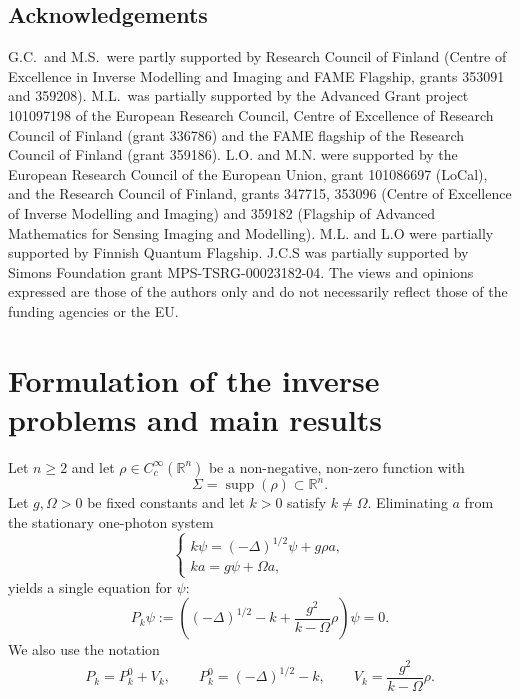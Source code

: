 \documentclass[12pt,a4paper]{amsart}
\numberwithin{equation}{section}
\theoremstyle{plain}
\theoremstyle{definition}
\begin{document}
\subsection*{Acknowledgements}
G.C.\ and M.S.~were partly supported by Research Council of Finland (Centre of Excellence in Inverse Modelling and Imaging and FAME Flagship, grants 353091 and 359208). M.L.\ was partially supported by the Advanced Grant project 101097198 of the European Research Council, Centre of Excellence of Research Council of Finland (grant 336786) and the FAME flagship of the Research Council of Finland (grant 359186). L.O. and M.N. were supported by the European Research Council of the European Union, grant 101086697 (LoCal),
and the Research Council of Finland, grants 347715,
353096 (Centre of Excellence of Inverse Modelling and Imaging)
and 359182 (Flagship of Advanced Mathematics for Sensing Imaging and Modelling).
M.L. and L.O  were partially supported by Finnish Quantum Flagship. J.C.S was partially supported by Simons Foundation grant MPS-TSRG-00023182-04.
The views and opinions expressed are those of the authors only and do not necessarily reflect those of the funding agencies or the EU.

\section{Formulation of the inverse problems and main results}\label{sec:formulation}

Let $n\geq 2$ and let $\rho\in C_c^\infty(\mathbb{R}^n)$ be a non-negative,  non-zero function with
\begin{equation*}
    \Sigma=\operatorname{supp}(\rho)\subset \mathbb{R}^n.
\end{equation*}
Let $g,\Omega>0$ be fixed constants and let $k>0$ satisfy $k\neq \Omega$.
Eliminating $a$ from the stationary one-photon system
\begin{equation*}
    \begin{cases}
        k\psi = (-\Delta)^{1/2}\psi + g\rho a,\\
        k a = g\psi + \Omega a,
    \end{cases}
\end{equation*}
yields a single equation for $\psi$:
\begin{equation}\label{eq:Pk}
    P_k\psi :=
    \left((-\Delta)^{1/2}-k+\frac{g^2}{k-\Omega}\rho\right)\psi = 0.
\end{equation}
We also use the notation
\begin{equation*}
    P_k = P_k^0 + V_k,
    \qquad
    P_k^0 = (-\Delta)^{1/2}-k,
    \qquad
    V_k = \frac{g^2}{k-\Omega}\rho.
\end{equation*}
\end{document}
